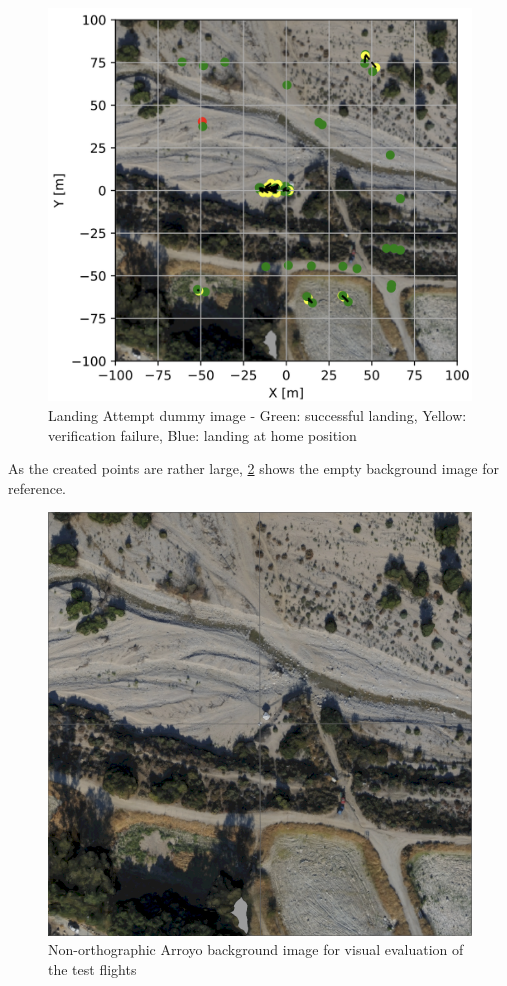 \begin{figure}[h]
    \begin{center}
        \includegraphics[scale=0.5]{images/evaluation/landings_random_WP_GT.png}
        \caption{Landing Attempt dummy image - Green: successful landing, Yellow: verification failure, Blue: landing at home position}
        \label{fig:landing_attempts_dummy}
    \end{center}
\end{figure}

As the created points are rather large, \cref{fig:Arroyo_BG} shows the empty background image for reference.

\begin{figure}[h]
\centering
\includegraphics[scale=0.4]{images/evaluation/high_100m_arroyo_grid.png}
\caption{Non-orthographic Arroyo background image for visual evaluation of the test flights}
\label{fig:Arroyo_BG}
\end{figure}
\clearpage%

